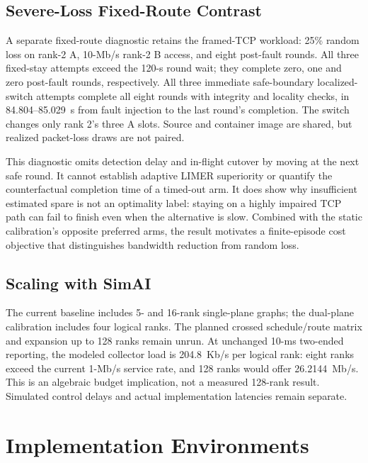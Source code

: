 \documentclass[sigconf]{acmart}
\begin{document}
\subsection{Severe-Loss Fixed-Route Contrast}
A separate fixed-route diagnostic retains the framed-TCP workload:
25\% random loss on rank-2 A, 10-Mb/s rank-2 B access, and eight
post-fault rounds. All three fixed-stay attempts exceed the 120-s
round wait; they complete zero, one and zero post-fault rounds,
respectively. All three immediate safe-boundary localized-switch
attempts complete all eight rounds with integrity and locality checks,
in 84.804--85.029~s from fault injection to the last round's completion.
The switch changes only rank 2's three A slots. Source and container
image are shared, but realized packet-loss draws are not paired.

This diagnostic omits detection delay and in-flight cutover by moving
at the next safe round. It cannot establish adaptive LIMER superiority
or quantify the counterfactual completion time of a timed-out arm.
It does show why insufficient estimated spare is not an optimality
label: staying on a highly impaired TCP path can fail to finish even
when the alternative is slow. Combined with the static calibration's
opposite preferred arms, the result motivates a finite-episode cost
objective that distinguishes bandwidth reduction from random loss.

\subsection{Scaling with SimAI}
The current baseline includes 5- and 16-rank single-plane graphs; the
dual-plane calibration includes four logical ranks. The planned crossed
schedule/route matrix and expansion up to 128 ranks remain unrun.
At unchanged 10-ms two-ended reporting, the modeled collector load is
204.8~Kb/s per logical rank: eight ranks exceed the current 1-Mb/s
service rate, and 128 ranks would offer 26.2144~Mb/s. This is an
algebraic budget implication, not a measured 128-rank result. Simulated
control delays and actual implementation latencies remain separate.

\section{Implementation Environments}
\label{app:implementation}
\end{document}
